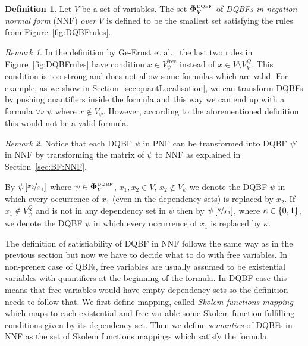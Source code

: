 \documentclass[
  digital, %
  color,
  twoside, %
  table,   %
  nolof,     %
  nolot,     %
]{fithesis3}
\let\setbuilder\set
\newcommand{\simpleset}[1]{\{{#1}\}}
\renewcommand{\set}[1]{\normalexpandarg\IfSubStr{#1}{|}{\setbuilder{#1}}{\simpleset{#1}}}
\theoremstyle{definition}
\newtheorem{definition}{Definition}
\theoremstyle{remark}
\newtheorem*{remark}{Remark}
\newcommand{\substitute}[2]{\left[ \nicefrac{#2}{#1} \right]}
\newcommand{\DQBF}[1]{\mathbf{\Phi}_{#1}^{\normalfont{\text{\tiny DQBF}}}}
\newcommand{\fvars}[1]{V_{#1}^{\mathrm{free}}}
\newcommand{\qvars}[1]{V_{#1}^{Q}}
\newcommand{\itholds}{\,}
\begin{document}
\begin{definition}
  Let $V$ be a set of variables. The set $\DQBF{V}$ of \emph{DQBFs in negation normal form} (NNF) \emph{over $V$} is defined to be the smallest set satisfying the rules from Figure~\ref{fig:DQBFrules}.
\end{definition}
\begin{remark}
In the definition by Ge-Ernst et al.~\cite{HQSquantifierLocalisation} the last two rules in Figure~\ref{fig:DQBFrules} have condition $x \in \fvars{\psi}$ instead of $x \in V \setminus \qvars{V}$. This condition is too strong and does not allow some formulas which are valid. 
For example, as we show in Section~\ref{sec:quantLocalisation}, we can transform DQBFs by pushing quantifiers inside the formula and this way we can end up with a formula $\forall x \itholds \psi$ where $x \not\in V_{\psi}$. However, according to the aforementioned definition this would not be a valid formula.
\end{remark}

\begin{remark}
Notice that each DQBF $\psi$ in PNF can be transformed into DQBF $\psi'$ in NNF by transforming the matrix of $\psi$ to NNF as explained in Section~\ref{sec:BF:NNF}.
\end{remark}

By $\psi\substitute{x_1}{x_2}$ where $\psi \in \DQBF{V}$, $x_1, x_2 \in V$, $x_2 \not\in V_{\psi}$ we denote the DQBF $\psi$ in which every occurrence of $x_1$ (even in the dependency sets) is replaced by $x_2$. If $x_1 \not\in \qvars{\psi}$ and is not in any dependency set in $\psi$ then by $\psi\substitute{x_1}{\kappa}$, where $\kappa\in\set{0,1}$, we denote the DQBF $\psi$ in which every occurrence of $x_1$ is replaced by $\kappa$.

The definition of satisfiability of DQBF in NNF follows the same way as in the previous section but now we have to decide what to do with free variables. In non-prenex case of QBFs, free variables are usually assumed to be existential variables with quantifiers at the beginning of the formula. In DQBF case this means that free variables would have empty dependency sets so the definition needs to follow that. We first define mapping, called \emph{Skolem functions mapping} which maps to each existential and free variable some Skolem function fulfilling conditions given by its dependency set. Then we define \emph{semantics} of DQBFs in NNF as the set of Skolem functions mappings which satisfy the formula.
\end{document}
